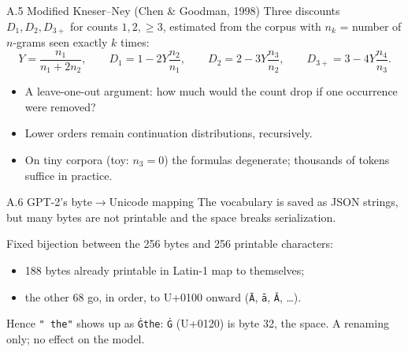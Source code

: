 \documentclass[11pt,aspectratio=169]{beamer}
\begin{document}
\begin{frame}{A.5 Modified Kneser--Ney (Chen \& Goodman, 1998)}
  Three discounts $D_1, D_2, D_{3+}$ for counts $1, 2, \ge 3$, estimated from the corpus
  with $n_k$ = number of $n$-grams seen exactly $k$ times:
  \[
    Y = \frac{n_1}{n_1 + 2n_2},\qquad
    D_1 = 1 - 2Y\frac{n_2}{n_1},\qquad
    D_2 = 2 - 3Y\frac{n_3}{n_2},\qquad
    D_{3+} = 3 - 4Y\frac{n_4}{n_3}.
  \]

  \vspace{0.8em}
  \begin{itemize}
    \item A leave-one-out argument: how much would the count drop if one occurrence were
          removed?
    \item Lower orders remain continuation distributions, recursively.
    \item On tiny corpora (toy: $n_3 = 0$) the formulas degenerate; thousands of tokens
          suffice in practice.
  \end{itemize}
\end{frame}

\begin{frame}{A.6 GPT-2's byte$\to$Unicode mapping}
  The vocabulary is saved as JSON strings, but many bytes are not printable and the space
  breaks serialization.

  \vspace{0.8em}
  Fixed bijection between the 256 bytes and 256 printable characters:
  \begin{itemize}
    \item 188 bytes already printable in Latin-1 map to themselves;
    \item the other 68 go, in order, to U+0100 onward (\texttt{\={A}}, \texttt{\={a}},
          \texttt{\u{A}}, \dots).
  \end{itemize}

  \vspace{0.8em}
  Hence \texttt{" the"} shows up as \texttt{\.{G}the}: \texttt{\.{G}} (U+0120) is byte 32,
  the space. A renaming only; no effect on the model.
\end{frame}
\end{document}
